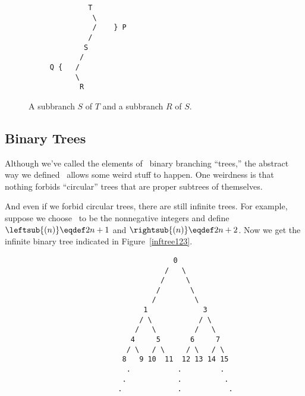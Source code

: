 \begin{definition}

\begin{figure}


\begin{center}
\begin{verbatim}
              T
               \
               /    } P
              /
             S
            /
     Q {   /
           \
            R
\end{verbatim}   
\end{center}

\caption{A subbranch $S$ of $T$ and  a subbranch $R$ of $S$.}

\label{PQdown}

\end{figure}

\subsection{Binary Trees}
Although we've called the elements of \brnch\ binary branching
``trees,'' the abstract way we defined \brnch\ allows some weird stuff
to happen.  One weirdness is that nothing forbids ``circular'' trees
that are proper subtrees of themselves.
\iffalse
For example, it is entirely
possible that there is a structure $T \in \brnch$ such that
\textcolor{red}{
\[
\leftsub{(T)} = T = \rightsub{(T)}.
\]}

This weird binary branching structure doesn't even have any leaves.
\fi
And even if we forbid circular trees, there are still infinite
trees.  For example, suppose we choose \brnch\ to be the nonnegative
integers and define $\leftsub{(n)} \eqdef 2n+1$ and $\rightsub{(n)} \eqdef
2n+2$.  Now we get the infinite binary tree indicated in
Figure~\ref{inftree123}.


\begin{figure}


\begin{verbatim}
                                  0
                                /   \
                               /     \
                              /       \
                             /         \
                           1             3
                          / \           / \
                         /   \         /   \
                        4     5       6     7
                       / \   / \     / \   / \
                      8   9 10  11  12 13 14 15
                       .           .         . 
                      .            .          .
                     .             .           . 
\end{verbatim}


\end{figure}
\end{definition}
